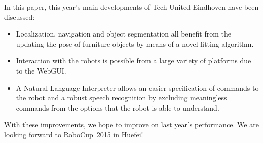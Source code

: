 In this paper, this year's main developments of Tech United Eindhoven have been discussed: 
\begin{itemize}
	\item Localization, navigation and object segmentation all benefit from the updating the pose of furniture objects by means of a novel fitting algorithm.
	\item Interaction with the robots is possible from a large variety of platforms due to the WebGUI.
	\item A Natural Language Interpreter allows an easier specification of commands to the robot and a robust speech recognition by excluding meaningless commands from the options that the robot is able to understand.
\end{itemize}
With these improvements, we hope to improve on last year's performance. We are looking forward to RoboCup~2015 in Huefei! 